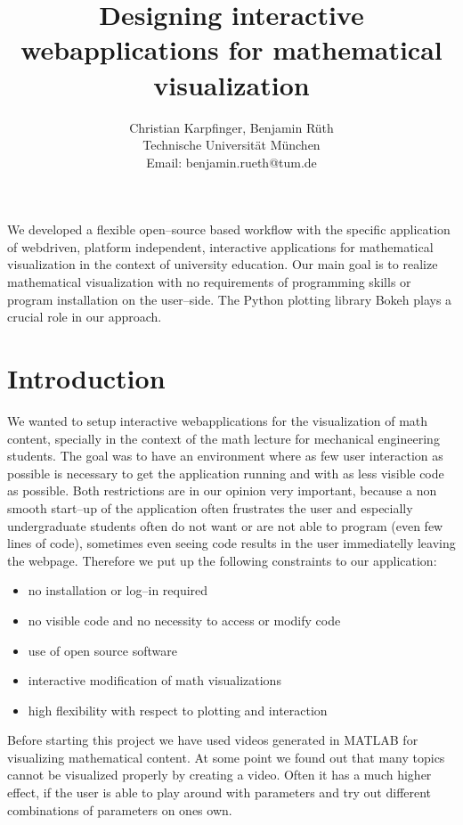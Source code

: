\documentclass[a4paper,pdftex]{scrartcl}
\begin{document}
\title{Designing interactive webapplications for mathematical visualization}
\subtitle{}

\author{
Christian Karpfinger, Benjamin Rüth\\
Technische Universit\"at M\"unchen\\
Email: benjamin.rueth@tum.de 
}

\maketitle

We developed a flexible open--source based workflow with the specific application of webdriven, platform independent, interactive applications for mathematical visualization in the context of university education. Our main goal is to realize mathematical visualization with no requirements of programming skills or program installation on the user--side. The Python plotting library Bokeh plays a crucial role in our approach.

\section{Introduction}
We wanted to setup interactive webapplications for the visualization of math content, specially in the context of the math lecture for mechanical engineering students. The goal was to have an environment where as few user interaction as possible is necessary to get the application running and with as less visible code as possible. Both restrictions are in our opinion very important, because a non smooth start--up of the application often frustrates the user and especially undergraduate students often do not want or are not able to program (even few lines of code), sometimes even seeing code results in the user immediatelly leaving the webpage. Therefore we put up the following constraints to our application:
\begin{itemize}
\item no installation or log--in required
\item no visible code and no necessity to access or modify code 
\item use of open source software
\item interactive modification of math visualizations
\item high flexibility with respect to plotting and interaction
\end{itemize}
Before starting this project we have used videos generated in MATLAB for visualizing mathematical content. At some point we found out that many topics cannot be visualized properly by creating a video. Often it has a much higher effect, if the user is able to play around with parameters and try out different combinations of parameters on ones own.
\end{document}
